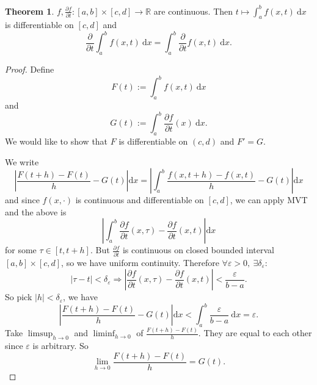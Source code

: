 \documentclass[a4paper]{article}
\theoremstyle{definition}
\newtheorem{thm}[defn]{Theorem}
\begin{document}
\begin{thm}
$f,\frac{\partial f}{\partial t}:[a,b]\times [c,d]\rightarrow \mathbb R$ are continuous. Then $t\mapsto \int_a^b f(x,t) \ \mathrm d x$ is differentiable on $[c,d]$ and
\[
\frac{\partial}{\partial t} \int_a^b f(x,t) \ \mathrm d x = \int_a^b \frac{\partial }{\partial t} f(x,t) \ \mathrm d x .
\]
\end{thm}
\begin{proof}
Define
\[
F(t):=\int_a^b f(x,t) \ \mathrm d x
\]
and
\[
G(t) := \int_a^b \frac{\partial f}{\partial t} (x) \ \mathrm d x.
\]
We would like to show that $F$ is differentiable on $(c,d)$ and $F'=G$.

We write
\[
\left| \frac{F(t+h)-F(t)}{h}-G(t) \right|\mathrm dx = \left| \int_a^b \frac{f(x,t+h)-f(x,t)}{h}-G(t) \right|\mathrm  dx
\]
and since $f(x,\cdot)$ is continuous and differentiable on $[c,d]$, we can apply MVT and the above is
\[
\left| \int_a^b \frac{\partial f}{\partial t} (x,\tau) - \frac{\partial f}{\partial t} (x,t) \right|\mathrm d x
\]
for some $\tau \in [t,t+h]$. But $\frac{\partial f}{\partial t}$ is continuous on closed bounded interval $[a,b]\times [c,d]$, so we have uniform continuity. Therefore $\forall \varepsilon >0,\ \exists \delta_\varepsilon :$
\[
|\tau -t|<\delta_\varepsilon \Rightarrow \left| \frac{\partial f}{\partial t} (x,\tau) - \frac{\partial f}{\partial t} (x,t) \right| < \frac{\varepsilon}{b-a} .
\]
So pick $|h|<\delta_\varepsilon$, we have
\[
\left| \frac{F(t+h)-F(t)}{h}-G(t) \right|\mathrm dx<\int_a^b \frac{\varepsilon}{b-a} \ \mathrm d x=\varepsilon .
\]
Take $\limsup_{h\rightarrow 0}$ and $\liminf_{h\rightarrow 0}$ of $\frac{F(t+h)-F(t)}{h}$. They are equal to each other since $\varepsilon$ is arbitrary. So
\[
\lim_{h\rightarrow 0} \frac{F(t+h)-F(t)}{h}=G(t).
\]
\end{proof}
\end{document}
